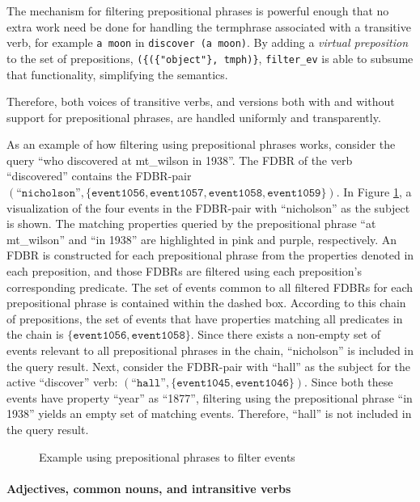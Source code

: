 \documentclass[../main.tex]{subfiles}
\begin{document}
The mechanism for filtering prepositional phrases is powerful enough that no extra work need be done for handling the termphrase associated with a transitive verb, for example
\texttt{a moon} in \texttt{discover (a moon)}.  By adding a {\em
virtual preposition} to the set of prepositions, \texttt{(\{(\{"object"\},
tmph)\}}, \texttt{filter\_ev} is able to subsume that functionality, simplifying
the semantics.

Therefore, both voices of transitive verbs, and versions both with and without support for prepositional phrases, are handled uniformly and transparently.

As an example of how filtering using prepositional phrases works, consider the query ``who discovered at mt\_wilson in 1938''.
The FDBR of the verb ``discovered'' contains the FDBR-pair $\left(\text{``}\mathtt{nicholson}\text{''}, \{\mathtt{event1056}, \mathtt{event1057}, \mathtt{event1058}, \mathtt{event1059}\}\right)$.
In Figure \ref{fig:prepfilt}, a visualization of the four events in the FDBR-pair with ``nicholson'' as the subject is shown.  The matching properties queried
by the prepositional phrase ``at mt\_wilson'' and ``in 1938'' are highlighted in pink and purple, respectively.  An FDBR is constructed for each prepositional phrase from the properties denoted in each preposition, and those FDBRs are filtered using each preposition's corresponding predicate.  The set of events common to all filtered FDBRs for each prepositional phrase is contained within the dashed box.  According to this chain of prepositions, the set of events that have properties matching all predicates in the chain is $\{\mathtt{event1056},\mathtt{event1058}\}$.  Since there exists a non-empty set of events relevant to all prepositional phrases in the chain, ``nicholson'' is included in the query result.
Next, consider the FDBR-pair with ``hall'' as the subject for the active ``discover'' verb: $\left(\text{``}\mathtt{hall}\text{''}, \{\mathtt{event1045}, \mathtt{event1046}\}\right)$.
Since both these events have property ``year'' as ``1877'', filtering using the prepositional phrase ``in 1938'' yields an empty set of matching events.  Therefore, ``hall'' is not
included in the query result.

\begin{figure}
	\centering
	\caption{Example using prepositional phrases to filter events}
	\label{fig:prepfilt}
\end{figure}


\paragraph{Adjectives, common nouns, and intransitive verbs}
\end{document}
